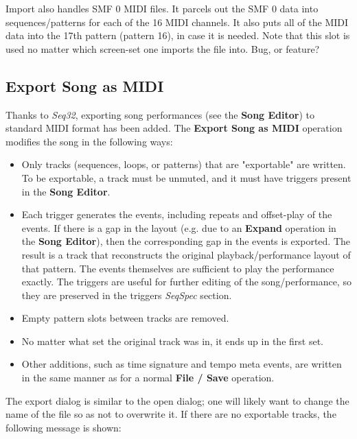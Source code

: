    Import also handles SMF 0 MIDI files.  It parcels out the SMF 0 data
   into sequences/patterns for each of the 16 MIDI channels.  It also puts
   all of the MIDI data into the 17th pattern (pattern 16), in case it is
   needed.  Note that this slot is used no matter which screen-set one imports
   the file into.  Bug, or feature?

\subsection{Export Song as MIDI}
\label{subsec:midi_export_file_export}

   Thanks to \textsl{Seq32}, exporting song performances (see the
   \textbf{Song Editor}) to standard MIDI format has been added.
   The \textbf{Export Song as MIDI} operation modifies the song in the
   following ways:

   \begin{itemize}
      \item Only tracks (sequences, loops, or patterns)
         that are "exportable" are written.  To be exportable, a
         track must be unmuted, and it must have triggers present
         in the \textbf{Song Editor}.
      \item Each trigger generates the events, including repeats and
         offset-play of the events.
         If there is a gap in the layout
         (e.g. due to an \textbf{Expand} operation in the
         \textbf{Song Editor}),
         then the corresponding gap in the events is exported.
         The result is a track that reconstructs the original
         playback/performance layout of that pattern.
         The events themselves are sufficient to play the performance exactly.
         The triggers are useful for further editing of the song/performance,
         so they are preserved in the triggers \textsl{SeqSpec} section.
      \item Empty pattern slots between tracks are removed.
      \item No matter what set the original track was in, it ends up in the
         first set.
      \item Other additions, such as time signature and tempo meta events, are
         written in the same manner as for a normal \textbf{File / Save}
         operation.
   \end{itemize}

   The export dialog is similar to the open dialog; one will likely want to
   change the name of the file so as not to overwrite it.
   If there are no exportable tracks, the following message is shown:


